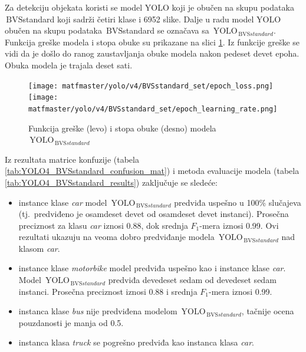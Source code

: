 \documentclass[12pt,oneside]{memoir}
\newcommand{\yolo}{\ensuremath{\,\textrm{YOLO}}}
\newcommand{\bvs}{\ensuremath{\,\textrm{BVS}}}
\begin{document}
Za detekciju objekata koristi se model YOLO koji je obučen na skupu podataka \bvs{standard} koji sadrži četiri klase i 6952 slike. Dalje u radu model YOLO obučen na skupu podataka \bvs{standard} se označava sa $\yolo_{\bvs{standard}}$. Funkcija greške modela i stopa obuke su prikazane na slici \ref{fig:YOLO4_BVSstandard_loss}. Iz funkcije greške se vidi da je došlo do ranog zaustavljanja obuke modela nakon pedeset devet epoha. Obuka modela je trajala deset sati.

\begin{figure}[!ht]
\centering
    \texttt{[image: matfmaster/yolo/v4/BVSstandard\_set/epoch\_loss.png]}
    \texttt{[image: matfmaster/yolo/v4/BVSstandard\_set/epoch\_learning\_rate.png]}
\caption{Funkcija greške (levo) i stopa obuke (desno) modela $\yolo_{\bvs{standard}}$ }
\label{fig:YOLO4_BVSstandard_loss}
\end{figure}

Iz rezultata matrice konfuzije (tabela \ref{tab:YOLO4_BVSstandard_confusion_mat}) i metoda evaluacije modela (tabela \ref{tab:YOLO4_BVSstandard_results}) zaključuje se sledeće:
\begin{itemize}
    \item instance klase \textit{car} model $\yolo_{\bvs{standard}}$ predviđa uspešno u 100\% slučajeva (tj.~predviđeno je osamdeset devet od osamdeset devet instanci). Prosečna preciznost za klasu \textit{car} iznosi 0.88, dok srednja $F_1$-mera iznosi 0.99. Ovi rezultati ukazuju na veoma dobro predviđanje modela  $\yolo_{\bvs{standard}}$ nad klasom \textit{car}.
    \item instance klase \textit{motorbike} model predviđa uspešno kao i instance klase \textit{car}. Model $\yolo_{\bvs{standard}}$ predviđa devedeset sedam od devedeset sedam instanci. Prosečna preciznost iznosi 0.88 i srednja $F_1$-mera iznosi 0.99.
    \item instanca klase \textit{bus} nije predviđena modelom  $\yolo_{\bvs{standard}}$, tačnije ocena pouzdanosti je manja od 0.5.
    \item instanca klasa \textit{truck} se pogrešno predviđa kao instanca klasa \textit{car}. 
\end{itemize}
\end{document}
